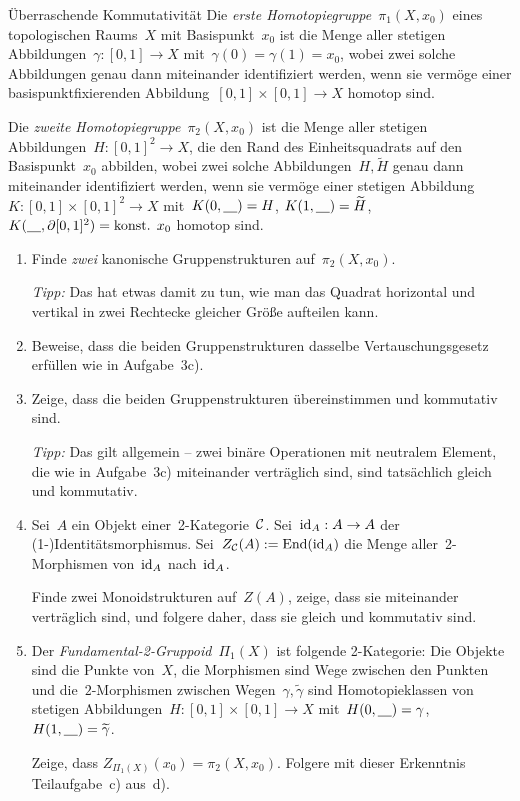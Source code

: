 \documentclass{uebblatt}
\begin{document}
\begin{aufgabe}{Überraschende Kommutativität}
Die \emph{erste Homotopiegruppe}~$\pi_1(X,x_0)$ eines topologischen Raums~$X$
mit Basispunkt~$x_0$ ist die Menge aller stetigen Abbildungen~$\gamma : [0,1]
\to X$ mit~$\gamma(0) = \gamma(1) = x_0$, wobei zwei solche Abbildungen genau
dann miteinander identifiziert werden, wenn sie vermöge einer
basispunktfixierenden Abbildung~$[0,1] \times [0,1] \to X$ homotop sind.

Die \emph{zweite Homotopiegruppe}~$\pi_2(X,x_0)$ ist
die Menge aller stetigen Abbildungen~$H : [0,1]^2 \to X$, die den Rand des
Einheitsquadrats auf den Basispunkt~$x_0$ abbilden, wobei zwei solche
Abbildungen~$H, \widetilde H$ genau dann miteinander identifiziert werden, wenn sie vermöge
einer stetigen Abbildung~$K : [0,1] \times [0,1]^2 \to X$
mit~$K(0,\underline{\quad}) = H$, $K(1,\underline{\quad}) = \widetilde H$,
$K(\underline{\quad},\partial [0,1]^2) = \text{konst. $x_0$}$ homotop
sind.

\begin{enumerate}
\item Finde \emph{zwei} kanonische Gruppenstrukturen auf~$\pi_2(X,x_0)$.

\emph{Tipp:} Das hat etwas damit zu tun, wie man das Quadrat horizontal und
vertikal in zwei Rechtecke gleicher Größe aufteilen kann.

\item Beweise, dass die beiden Gruppenstrukturen dasselbe Vertauschungsgesetz
erfüllen wie in Aufgabe~3c).
\item Zeige, dass die beiden Gruppenstrukturen übereinstimmen und kommutativ
sind.

\emph{Tipp:} Das gilt allgemein -- zwei binäre Operationen mit neutralem
Element, die wie in Aufgabe~3c) miteinander verträglich sind, sind tatsächlich
gleich und kommutativ.

\item Sei~$A$ ein Objekt einer~2-Kategorie~$\mathcal{C}$. Sei~$\mathrm{id}_A : A \to A$ der
(1-)Identitätsmorphismus. Sei~$Z_{\mathcal{C}}(A) := \mathrm{End}(\mathrm{id}_A)$ die Menge
aller~2-Morphismen von~$\mathrm{id}_A$ nach~$\mathrm{id}_A$.

Finde zwei Monoidstrukturen auf~$Z(A)$, zeige, dass sie miteinander
verträglich sind, und folgere daher, dass sie gleich und kommutativ sind.

\item Der \emph{Fundamental-2-Gruppoid}~$\Pi_1(X)$ ist folgende 2-Kategorie:
Die Objekte sind die Punkte von~$X$, die Morphismen sind Wege zwischen den
Punkten und die~$2$-Morphismen zwischen Wegen~$\gamma, \widetilde\gamma$ sind
Homotopieklassen von stetigen Abbildungen~$H : [0,1] \times [0,1] \to X$
mit~$H(0,\underline{\quad}) = \gamma$, $H(1,\underline{\quad}) = \widetilde\gamma$.

Zeige, dass $Z_{\Pi_1(X)}(x_0) = \pi_2(X,x_0)$. Folgere mit dieser Erkenntnis
Teilaufgabe~c) aus~d).
\end{enumerate}
\end{aufgabe}
\end{document}
